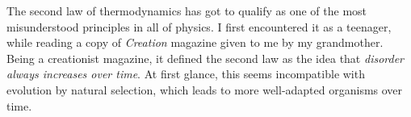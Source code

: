 \documentclass[a4paper, 12pt]{article}
\title{}
\author{Brendon J. Brewer}
\begin{document}
\sffamily
\maketitle

The second law of thermodynamics has got to qualify as one of the most
misunderstood principles in all of physics.
I first encountered it
as a teenager, while reading a copy of {\em Creation} magazine given to me
by my grandmother. Being a creationist magazine, it defined the second law as
the idea that {\em disorder always increases over time}.
At first glance, this seems incompatible with evolution by
natural selection, which leads to more well-adapted organisms over time.
\end{document}
